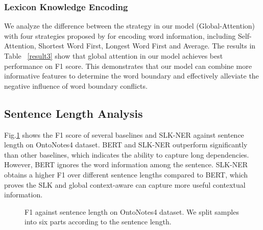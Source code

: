 \documentclass[conference]{IEEEtran}
\begin{document}
\subsubsection{Lexicon Knowledge Encoding}
We analyze the difference between the strategy in our model (Global-Attention) with four strategies proposed by \cite{liu2019encoding} 
for encoding word information, including Self-Attention, Shortest Word First, Longest Word First and Average.
The results in Table ~\ref{result3} show that global attention in our model achieves best performance on F1 score.
This demonstrates that our model can combine more informative features to determine the word boundary
and effectively alleviate the negative influence of word boundary conflicts.













     











\subsection{Sentence Length Analysis}

Fig.\ref{length} shows the F1 score of several baselines and SLK-NER against
sentence length on OntoNotes4 dataset. 
BERT and SLK-NER outperform significantly than other baselines, which indicates 
the ability to capture long dependencies. However, BERT ignores the word information among the sentence.
SLK-NER obtains a higher F1 over different sentence lengths compared to BERT,
which proves the SLK and global context-aware can capture more useful contextual information.
\begin{figure}[h]
    \caption{F1 against sentence length on OntoNotes4 dataset. We split samples into six parts according to the sentence length.}
    \label{length}
\end{figure}
\end{document}
